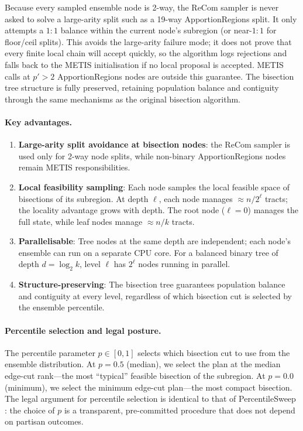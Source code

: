 Because every sampled ensemble node is 2-way, the ReCom sampler is never asked
to solve a large-arity split such as a 19-way ApportionRegions split. It only
attempts a $1:1$ balance within the current node's subregion (or near-$1:1$ for
floor/ceil splits). This avoids the large-arity failure mode; it does not prove
that every finite local chain will accept quickly, so the algorithm logs
rejections and falls back to the METIS initialisation if no local proposal is
accepted. METIS calls at $p'>2$ ApportionRegions nodes are outside this
guarantee. The bisection tree structure is fully preserved, retaining population
balance and contiguity through the same mechanisms as the original bisection
algorithm.

\paragraph{Key advantages.}
\begin{enumerate}
  \item \textbf{Large-arity split avoidance at bisection nodes}: the ReCom
        sampler is used only for 2-way node splits, while non-binary
        ApportionRegions nodes remain METIS responsibilities.
  \item \textbf{Local feasibility sampling}: Each node samples the local
        feasible space of bisections of its subregion. At depth $\ell$, each
        node manages $\approx n/2^\ell$ tracts; the locality advantage grows
        with depth. The root node ($\ell=0$) manages the full state, while
        leaf nodes manage $\approx n/k$ tracts.
  \item \textbf{Parallelisable}: Tree nodes at the same depth are independent;
        each node's ensemble can run on a separate CPU core. For a balanced
        binary tree of depth $d = \log_2 k$, level $\ell$ has $2^\ell$ nodes
        running in parallel.
  \item \textbf{Structure-preserving}: The bisection tree guarantees population
        balance and contiguity at every level, regardless of which bisection cut
        is selected by the ensemble percentile.
\end{enumerate}

\paragraph{Percentile selection and legal posture.}
The percentile parameter $p \in [0, 1]$ selects which bisection cut to use from
the ensemble distribution. At $p = 0.5$ (median), we select the plan at the
median edge-cut rank---the most ``typical'' feasible bisection of the subregion.
At $p = 0.0$ (minimum), we select the minimum edge-cut plan---the most compact
bisection. The legal argument for percentile selection is identical to that of
PercentileSweep \citep{dellaLibera2026percentilesweep}: the choice of $p$ is
a transparent, pre-committed procedure that does not depend on partisan outcomes.

